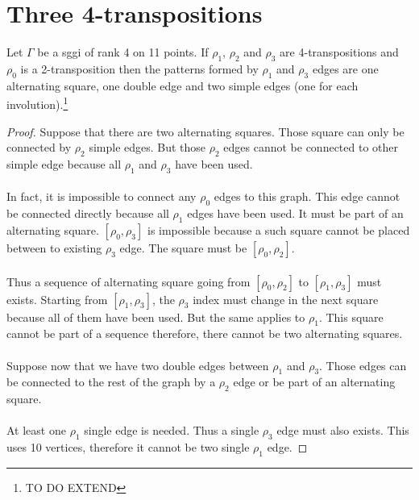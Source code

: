 \section{Three 4-transpositions}

\begin{lemma}
  Let $\Gamma$ be a sggi of rank 4 on 11 points. If $\rho_1$, $\rho_2$ and $\rho_3$ are 4-transpositions and $\rho_0$ is a 2-transposition then the patterns formed by $\rho_1$ and $\rho_3$ edges are one alternating square, one double edge and two simple edges (one for each involution).\footnote{TO DO EXTEND}
\end{lemma}

\begin{proof}
  Suppose that there are two alternating squares. Those square can only be connected by $\rho_2$ simple edges. But those $\rho_2$ edges cannot be connected to other simple edge because all $\rho_1$ and $\rho_3$ have been used.

  \paragraph{}
  In fact, it is impossible to connect any $\rho_0$ edges to this graph. This edge cannot be connected directly because all $\rho_1$ edges have been used. It must be part of an alternating square. $[\rho_0, \rho_3]$ is impossible because a such square cannot be placed between to existing $\rho_3$ edge. The square must be $[\rho_0, \rho_2]$.

  \paragraph{}
  Thus a sequence of alternating square going from $[\rho_0, \rho_2]$ to $[\rho_1, \rho_3]$ must exists. Starting from $[\rho_1, \rho_3]$, the $\rho_3$ index must change in the next square because all of them have been used. But the same applies to $\rho_1$. This square cannot be part of a sequence therefore, there cannot be two alternating squares.

  \paragraph{}
  Suppose now that we have two double edges between $\rho_1$ and $\rho_3$. Those edges can be connected to the rest of the graph by a $\rho_2$ edge or be part of an alternating square.

  \paragraph{}
  At least one $\rho_1$ single edge is needed. Thus a single $\rho_3$ edge must also exists. This uses 10 vertices, therefore it cannot be two single $\rho_1$ edge.


\end{proof}
